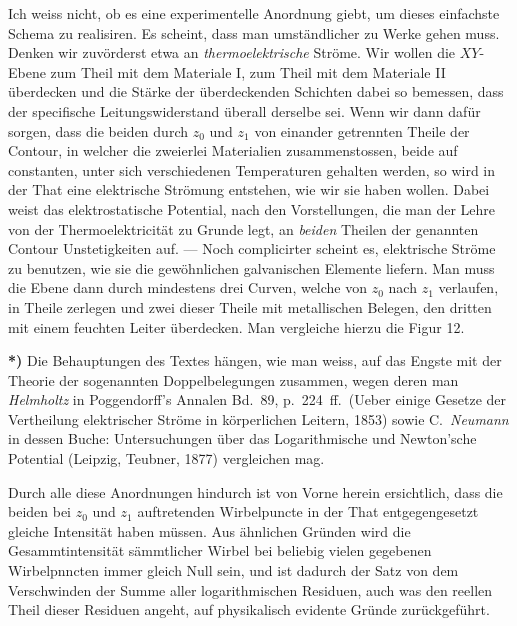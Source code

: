 \documentclass{article}
\begin{document}
Ich weiss nicht, ob es eine experimentelle Anordnung giebt, um dieses einfachste Schema zu realisiren. Es scheint, dass man umständlicher zu Werke gehen muss. Denken wir zuvörderst etwa an \emph{thermoelektrische} Ströme. Wir wollen die $XY$-Ebene zum Theil mit dem Materiale I, zum Theil mit dem Materiale II überdecken und die Stärke der überdeckenden Schichten dabei so bemessen, dass der specifische Leitungswiderstand überall derselbe sei. Wenn wir dann dafür sorgen, dass die beiden durch $z_{0}$ und $z_{1}$ von einander getrennten Theile der Contour, in welcher die zweierlei Materialien zusammenstossen, beide auf constanten, unter sich verschiedenen Temperaturen gehalten werden, so wird in der That eine elektrische Strömung entstehen, wie wir sie haben wollen. Dabei weist das elektrostatische Potential, nach den Vorstellungen, die man der Lehre von der Thermoelektricität zu Grunde legt, an \emph{beiden} Theilen der genannten Contour Unstetigkeiten auf. --- Noch complicirter scheint es, elektrische Ströme zu benutzen, wie sie die gewöhnlichen galvanischen Elemente liefern. Man muss die Ebene dann durch mindestens drei Curven, welche von $z_{0}$ nach $z_{1}$ verlaufen, in Theile zerlegen und zwei dieser Theile mit metallischen Belegen, den dritten mit einem feuchten Leiter überdecken. Man vergleiche hierzu die Figur 12.

\textbf{*)} Die Behauptungen des Textes hängen, wie man weiss, auf das Engste mit der Theorie der sogenannten Doppelbelegungen zusammen, wegen deren man \emph{Helmholtz} in Poggendorff's Annalen Bd.~89, p.~224~ff.\ (Ueber einige Gesetze der Vertheilung elektrischer Ströme in körperlichen Leitern, 1853) sowie C.\ \emph{Neumann} in dessen Buche: Untersuchungen über das Logarithmische und Newton'sche Potential (Leipzig, Teubner, 1877) vergleichen mag.



Durch alle diese Anordnungen hindurch ist von Vorne herein ersichtlich, dass die beiden bei $z_{0}$ und $z_{1}$ auftretenden Wirbelpuncte in der That entgegengesetzt gleiche Intensität haben müssen. Aus ähnlichen Gründen wird die Gesammtintensität sämmtlicher Wirbel bei beliebig vielen gegebenen Wirbelpnncten immer gleich Null sein, und ist dadurch der Satz von dem Verschwinden der Summe aller logarithmischen Residuen, auch was den reellen Theil dieser Residuen angeht, auf physikalisch evidente Gründe zurückgeführt.
\end{document}
